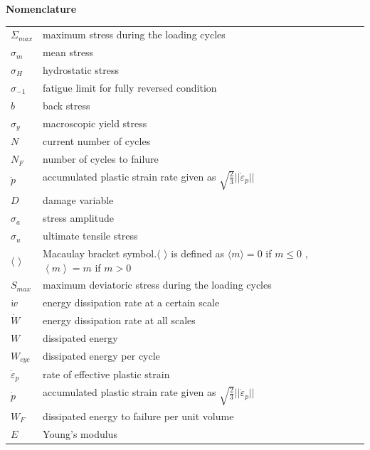 \documentclass[3p,times,procedia,number]{elsarticle}
\begin{document}
\clearpage
\begin{flushleft}
	\textbf{Nomenclature}
	\vspace{6pt}
	\begin{table}[h]
		\begin{tabular}{lllll}
			$\Sigma_{max}$ & maximum stress during the loading cycles &  &  &  \\
			$\sigma_m$ & mean stress &  &  &  \\
			$\sigma_H$ & hydrostatic stress &  &  &  \\
			$\sigma_{-1}$ & fatigue limit for fully reversed condition  &  &  &  \\
			$b$ & back stress  &  &  &  \\
			$\sigma_{y}$ & macroscopic yield stress &  &  &  \\
		    $N$& current number of cycles &  &  &  \\
			$N_F$& number of cycles to failure &  &  &  \\
			 $\dot{p}$ & accumulated plastic strain rate given as $\sqrt{\frac{2}{3}}||\dot{\varepsilon}_p||$ &  &  &  \\
			$D$ & damage variable  &  &  &  \\
			$\sigma_{a}$ & stress amplitude &  &  &  \\
			$\sigma_{u}$ & ultimate tensile stress &  &  &  \\
			$\langle$ $\rangle$& Macaulay bracket symbol.$\langle$ $\rangle$ is defined as $\langle m\rangle=0$ if $m\leqslant0$ , $\left\langle m\right\rangle=m$ if $m>0$&  &  &  \\
						$S_{max}$ & maximum deviatoric stress during the loading cycles &  &  &  \\
						$\dot{w}$ & energy dissipation rate at a certain scale &  &  &  \\
						$\dot{W}$ & energy dissipation rate at all scales &  &  &  \\
						$W$ & dissipated energy&  &  &  \\
						$W_{cyc}$ & dissipated energy per cycle &  &  &  \\
						$ \dot{\varepsilon}_p$ & rate of effective plastic strain &  &  &  \\
						$\dot{p}$ & accumulated plastic strain rate given as $\sqrt{\frac{2}{3}}||\dot{\varepsilon}_p||$ &  &  &  \\
						$W_F$ & dissipated energy to failure per unit volume &  &  &  \\
						$E$ & Young's modulus &  &  &  \\

\end{tabular}
\end{table}
\end{flushleft}
\end{document}
